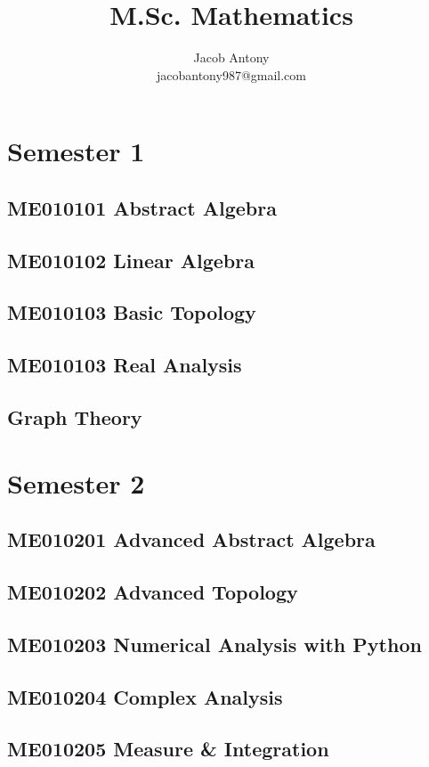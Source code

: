 \documentclass[a4paper,10pt,openany]{book}
\title{M.Sc. Mathematics}
\author{Jacob Antony\\jacobantony987@gmail.com}
\begin{document}
\part{Semester 1}
\chapter{ME010101 Abstract Algebra}

\chapter{ME010102 Linear Algebra}

\chapter{ME010103 Basic Topology}

\chapter{ME010103 Real Analysis}

\chapter{Graph Theory}


\part{Semester 2}
\chapter{ME010201 Advanced Abstract Algebra}

\chapter{ME010202 Advanced Topology}

\chapter{ME010203 Numerical Analysis with Python}

\chapter{ME010204 Complex Analysis}

\chapter{ME010205 Measure \& Integration}

\end{document}
